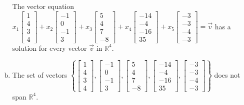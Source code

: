 \begin{exerciseAnswer}
\begin{enumerate}[(a)]
\begin{center}\begin{minipage}{0.8\textwidth}
 The vector equation \( x_{1} \left[\begin{array}{c}
1 \\
4 \\
3 \\
4
\end{array}\right] + x_{2} \left[\begin{array}{c}
-1 \\
0 \\
-1 \\
3
\end{array}\right] + x_{3} \left[\begin{array}{c}
5 \\
4 \\
7 \\
-8
\end{array}\right] + x_{4} \left[\begin{array}{c}
-14 \\
-4 \\
-16 \\
35
\end{array}\right] + x_{5} \left[\begin{array}{c}
-3 \\
-3 \\
-4 \\
-3
\end{array}\right] =\vec{v}\) has a solution for every vector \(\vec{v}\) in \(\mathbb{R}^4\). 
\end{minipage}\end{center}
    
\item  The set of vectors \( \left\{ \left[\begin{array}{c}
1 \\
4 \\
3 \\
4
\end{array}\right] , \left[\begin{array}{c}
-1 \\
0 \\
-1 \\
3
\end{array}\right] , \left[\begin{array}{c}
5 \\
4 \\
7 \\
-8
\end{array}\right] , \left[\begin{array}{c}
-14 \\
-4 \\
-16 \\
35
\end{array}\right] , \left[\begin{array}{c}
-3 \\
-3 \\
-4 \\
-3
\end{array}\right] \right\} \) does not span \(\mathbb{R}^4\). 
\end{enumerate}
    
\end{exerciseAnswer}
    
